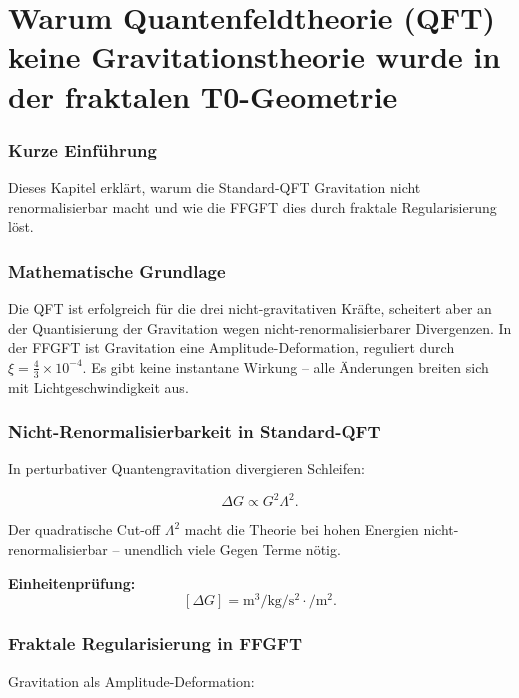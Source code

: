\chapter{Warum Quantenfeldtheorie (QFT) keine Gravitationstheorie wurde in der fraktalen T0-Geometrie}


	
	\subsection*{Kurze Einführung}
	
	Dieses Kapitel erklärt, warum die Standard-QFT Gravitation nicht renormalisierbar macht und wie die FFGFT dies durch fraktale Regularisierung löst.
	
	\subsection*{Mathematische Grundlage}
	
	Die QFT ist erfolgreich für die drei nicht-gravitativen Kräfte, scheitert aber an der Quantisierung der Gravitation wegen nicht-renormalisierbarer Divergenzen. In der FFGFT ist Gravitation eine Amplitude-Deformation, reguliert durch \(\xi = \frac{4}{3} \times 10^{-4}\). Es gibt keine instantane Wirkung – alle Änderungen breiten sich mit Lichtgeschwindigkeit aus.
	
	\subsection*{Nicht-Renormalisierbarkeit in Standard-QFT}
	
	In perturbativer Quantengravitation divergieren Schleifen:
	
	\begin{equation}
		\Delta G \propto G^2 \Lambda^2.
	\end{equation}
	
	Der quadratische Cut-off \(\Lambda^2\) macht die Theorie bei hohen Energien nicht-renormalisierbar – unendlich viele Gegen Terme nötig.
	
	\textbf{Einheitenprüfung:}
	\[
	[\Delta G] = \si{\meter\cubed\per\kilo\gram\per\second\squared} \cdot \si{\per\meter^2}.
	\]
	
	\subsection*{Fraktale Regularisierung in FFGFT}
	
	Gravitation als Amplitude-Deformation:
	
